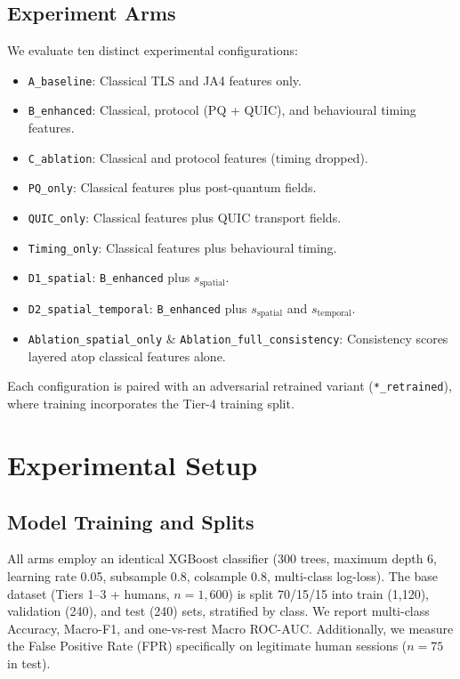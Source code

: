 \documentclass[conference]{IEEEtran}
\begin{document}
\subsection{Experiment Arms}
We evaluate ten distinct experimental configurations:
\begin{itemize}
    \item \texttt{A\_baseline}: Classical TLS and JA4 features only.
    \item \texttt{B\_enhanced}: Classical, protocol (PQ + QUIC), and behavioural timing features.
    \item \texttt{C\_ablation}: Classical and protocol features (timing dropped).
    \item \texttt{PQ\_only}: Classical features plus post-quantum fields.
    \item \texttt{QUIC\_only}: Classical features plus QUIC transport fields.
    \item \texttt{Timing\_only}: Classical features plus behavioural timing.
    \item \texttt{D1\_spatial}: \texttt{B\_enhanced} plus $s_{\text{spatial}}$.
    \item \texttt{D2\_spatial\_temporal}: \texttt{B\_enhanced} plus $s_{\text{spatial}}$ and $s_{\text{temporal}}$.
    \item \texttt{Ablation\_spatial\_only} \& \texttt{Ablation\_full\_consistency}: Consistency scores layered atop classical features alone.
\end{itemize}
Each configuration is paired with an adversarial retrained variant (\texttt{*\_retrained}), where training incorporates the Tier-4 training split.

\section{Experimental Setup}

\subsection{Model Training and Splits}
All arms employ an identical XGBoost \cite{chen2016xgboost} classifier (300 trees, maximum depth 6, learning rate 0.05, subsample 0.8, colsample 0.8, multi-class log-loss). The base dataset (Tiers 1--3 + humans, $n=1,600$) is split 70/15/15 into train (1,120), validation (240), and test (240) sets, stratified by class. We report multi-class Accuracy, Macro-F1, and one-vs-rest Macro ROC-AUC. Additionally, we measure the False Positive Rate (FPR) specifically on legitimate human sessions ($n=75$ in test).
\end{document}
